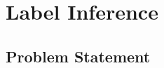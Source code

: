 \chapter{Label Inference}\label{\positionnumber}
\section{Problem Statement}\label{\positionnumber}
